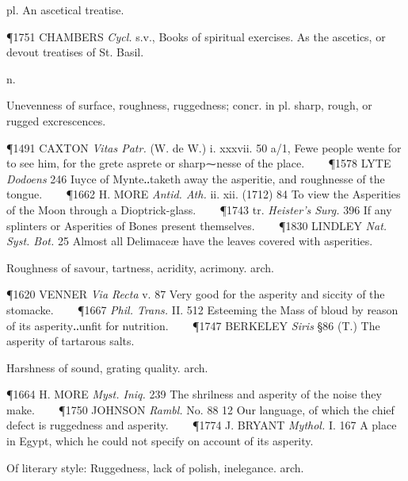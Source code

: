 \begin{description}[wide, labelwidth=!, labelindent=0pt]
\begin{myenumerate}
 pl. An ascetical treatise.

\P 1751 CHAMBERS  \textit{Cycl.} s.v., Books of spiritual exercises. As the ascetics, or devout treatises of St. Basil.
\end{myenumerate}


 n.

\noindent {}

\vspace{-0.3cm}

\begin{myenumerate}

 Unevenness of surface, roughness, ruggedness; concr. in pl. sharp, rough, or rugged excrescences.

\P 1491 CAXTON  \textit{Vitas Patr.} (W. de W.) i. xxxvii. 50 a/1, Fewe people wente for to see him, for the grete asprete or sharp⁓nesse of the place.    
\P 1578 LYTE  \textit{Dodoens} 246 Iuyce of Mynte‥taketh away the asperitie, and roughnesse of the tongue.    
\P 1662 H. MORE  \textit{Antid. Ath.} ii. xii. (1712) 84 To view the Asperities of the Moon through a Dioptrick-glass.    
\P 1743 tr.  \textit{Heister's Surg.} 396 If any splinters or Asperities of Bones present themselves.    
\P 1830 LINDLEY  \textit{Nat. Syst. Bot.} 25 Almost all Delimaceæ have the leaves covered with asperities.

 Roughness of savour, tartness, acridity, acrimony. arch.

\P 1620 VENNER  \textit{Via Recta} v. 87 Very good for the asperity and siccity of the stomacke.    
\P 1667 \textit{Phil. Trans.} II. 512 Esteeming the Mass of bloud by reason of its asperity‥unfit for nutrition.    
\P 1747 BERKELEY  \textit{Siris} §86 (T.) The asperity of tartarous salts.

 Harshness of sound, grating quality. arch.

\P 1664 H. MORE  \textit{Myst. Iniq.} 239 The shrilness and asperity of the noise they make.    
\P 1750 JOHNSON  \textit{Rambl.} No. 88 12 Our language, of which the chief defect is ruggedness and asperity.    
\P 1774 J. BRYANT  \textit{Mythol.} I. 167 A place in Egypt, which he could not specify on account of its asperity.

 Of literary style: Ruggedness, lack of polish, inelegance. arch.


\end{myenumerate}
\end{description}
